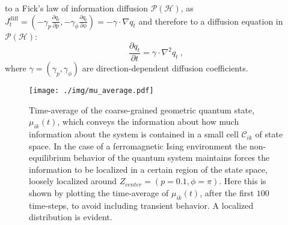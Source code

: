 \documentclass[%
 reprint,
 superscriptaddress,
 aps,
 pra,
]{revtex4-2}
\newcommand{\CC}[2]{\mathcal{C}_{#1 #2}}
\newcommand{\PH}{\mathcal{P}(\mathcal{H})}
\theoremstyle{definition}
\begin{document}
to a Fick's law of information diffusion $\PH$, as $J^{\mathrm{diff}}_t =  (-\gamma_p \frac{\partial q_t}{\partial p},-\gamma_\phi \frac{\partial q_t}{\partial \phi} ) = - \gamma \cdot \nabla q_t$
and therefore to a diffusion equation in $\PH$:
\begin{equation}
\frac{\partial q_t}{\partial t} =  \gamma \cdot \nabla^2 q_t~,
\end{equation}
where $\gamma = (\gamma_p,\gamma_\phi)$ are direction-dependent diffusion coefficients.
\begin{figure}[t!]
\centering
\texttt{[image: ./img/mu\_average.pdf]}
\caption{Time-average of the coarse-grained geometric quantum 
state, $\mu_{ik}(t)$, which conveys the information about how much
information about the system is contained in a small cell $\CC{i}{k}$ of state space.
In the case of a ferromagnetic Ising environment the non-equilibrium behavior
of the quantum system maintains forces the information to be localized in a certain
region of the state space, loosely localized around $Z_{center}=(p=0.1,\phi = \pi)$.
Here this is shown by plotting the time-average of $\mu_{ik}(t)$, after the first
$100$ time-steps, to avoid including transient behavior. A localized distribution
is evident.
	}
\label{fig:mu_average}
\end{figure}
\end{document}
